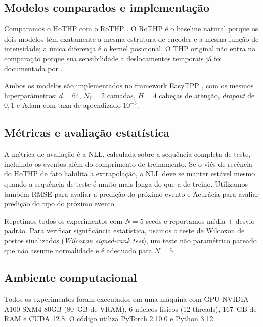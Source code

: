 \subsection{Modelos comparados e implementação}
\label{subsec:modelos-comparados}

Comparamos o HoTHP com o RoTHP \cite{gao_rothp_2024}. O RoTHP é o baseline natural porque os dois modelos têm exatamente a mesma estrutura de encoder e a mesma função de intensidade; a única diferença é o kernel posicional. O THP original não entra na comparação porque sua sensibilidade a deslocamentos temporais já foi documentada por .

Ambos os modelos são implementados no framework EasyTPP \cite{xue_easytpp_2024}, com os mesmos hiperparâmetros: $d = 64$, $N_{\ell} = 2$ camadas, $H = 4$ cabeças de atenção, \textit{dropout} de $0{,}1$ e Adam com taxa de aprendizado $10^{-3}$.

\subsection{Métricas e avaliação estatística}
\label{subsec:metricas}

A métrica de avaliação é a \gls{NLL}, calculada sobre a sequência completa de teste, incluindo os eventos além do comprimento de treinamento. Se o viés de recência do HoTHP de fato habilita a extrapolação, a NLL deve se manter estável mesmo quando a sequência de teste é muito mais longa do que a de treino. Utilizamos também RMSE para avaliar a predição do próximo evento e Acurácia para avaliar predição do tipo do próximo evento.

Repetimos todos os experimentos com $N = 5$ seeds e reportamos média $\pm$ desvio padrão. Para verificar significância estatística, usamos o teste de Wilcoxon de postos sinalizados (\textit{Wilcoxon signed-rank test}), um teste não paramétrico pareado que não assume normalidade e é adequado para $N = 5$.

\subsection{Ambiente computacional}
\label{subsec:ambiente-computacional}

Todos os experimentos foram executados em uma máquina com GPU NVIDIA A100-SXM4-80GB (80~GB de VRAM), 6 núcleos físicos (12 threads), 167~GB de RAM e CUDA 12.8. O código utiliza PyTorch 2.10.0 e Python 3.12.